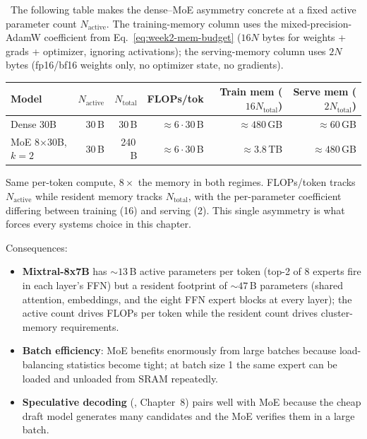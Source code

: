 \Ident\ The following table makes the dense--MoE asymmetry concrete
at a fixed active parameter count $N_{\mathrm{active}}$. The
training-memory column uses the mixed-precision-AdamW coefficient
from Eq.~\eqref{eq:week2-mem-budget} ($16 N$ bytes for weights +
grads + optimizer, ignoring activations); the serving-memory column
uses $2 N$ bytes (fp16/bf16 weights only, no optimizer state, no
gradients).
\begin{center}
\begin{tabular}{|l|r|r|r|r|r|}
\hline
Model & $N_{\mathrm{active}}$ & $N_{\mathrm{total}}$ & FLOPs/tok & Train mem ($16N_{\mathrm{total}}$) & Serve mem ($2N_{\mathrm{total}}$) \\
\hline
Dense 30B           & 30\,B  & 30\,B   & $\approx 6 \cdot 30$\,B  & $\approx 480$\,GB & $\approx 60$\,GB \\
MoE 8$\times$30B, $k{=}2$ & 30\,B  & 240\,B  & $\approx 6 \cdot 30$\,B  & $\approx 3.8$\,TB & $\approx 480$\,GB \\
\hline
\end{tabular}
\end{center}
Same per-token compute, $8\times$ the memory in both regimes.
FLOPs/token tracks $N_{\mathrm{active}}$ while resident memory tracks
$N_{\mathrm{total}}$, with the per-parameter coefficient differing
between training (16) and serving (2). This single asymmetry is what
forces every systems choice in this chapter.

Consequences:
\begin{itemize}
  \item \textbf{Mixtral-8x7B} \citep{jiang2024mixtral} has
        $\sim\!13$\,B active parameters per token (top-2 of 8 experts
        fire in each layer's FFN) but a resident footprint of
        $\sim\!47$\,B parameters (shared attention, embeddings, and
        the eight FFN expert blocks at every layer); the active
        count drives FLOPs per token while the resident count drives
        cluster-memory requirements.
  \item \textbf{Batch efficiency}: MoE benefits enormously from large
        batches because load-balancing statistics become tight; at
        batch size 1 the same expert can be loaded and unloaded from
        SRAM repeatedly.
  \item \textbf{Speculative decoding} (\citealt{leviathan2023speculative},
        Chapter~8) pairs well with MoE because the cheap draft model
        generates many candidates and the MoE verifies them in a
        large batch.
\end{itemize}


